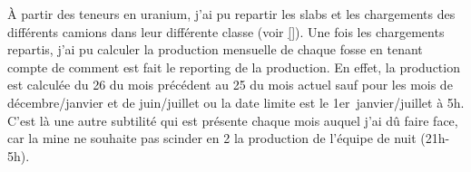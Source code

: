 À partir des teneurs en uranium, j'ai pu repartir les slabs et les chargements des différents camions dans leur différente classe (voir \ref{}). Une fois les chargements repartis, j'ai pu calculer la production mensuelle de chaque fosse en tenant compte de comment est fait le reporting de la production. En effet, la production est calculée du 26 du mois précédent au 25 du mois actuel sauf pour les mois de décembre/janvier et de juin/juillet ou la date limite est le 1er~janvier/juillet à 5h. C'est là une autre subtilité qui est présente chaque mois auquel j'ai dû faire face, car la mine ne souhaite pas scinder en 2 la production de l'équipe de nuit (21h-5h).